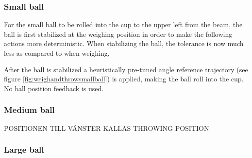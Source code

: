 \subsubsection{Small ball}\label{sec:small_ball_delivery}
For the small ball to be rolled into the cup to the upper left from the beam, the ball is first stabilized at the weighing position in order to make the following actions more deterministic.
When stabilizing the ball, the tolerance is now much less as compared to when weighing.

After the ball is stabilized a heuristically pre-tuned angle reference trajectory (see figure \ref{fig:weighandthrowsmallball}) is applied, making the ball roll into the cup.
No ball position feedback is used.

\subsubsection{Medium ball}\label{sec:medium_ball_delivery}
POSITIONEN TILL VÄNSTER KALLAS THROWING POSITION \\

\subsubsection{Large ball}\label{sec:large_ball_delivery}




